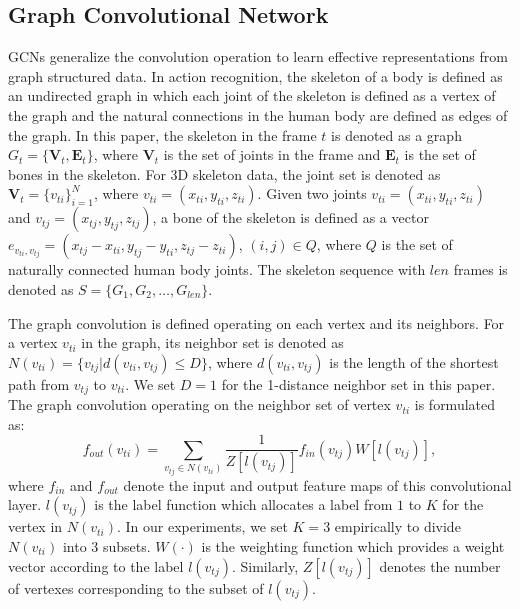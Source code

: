 \documentclass[runningheads]{llncs}
\begin{document}
\subsection{Graph Convolutional Network}
\label{section_gcn}
GCNs generalize the convolution operation to learn effective representations from graph structured data. In action recognition, the skeleton of a body is defined as an undirected graph in which each joint of the skeleton is defined as a vertex of the graph and the natural connections in the human body are defined as edges of the graph. In this paper, the skeleton in the frame $t$ is denoted as a graph $G_t=\{\textbf{V}_t,\textbf{E}_t\}$, where $\textbf{V}_t$ is the set of joints in the frame and $\textbf{E}_t$ is the set of bones in the skeleton. For 3D skeleton data, the joint set is denoted as $\textbf{V}_t = \{v_{ti}\}^N_{i=1}$, where $v_{ti}=(x_{ti},y_{ti},z_{ti})$. Given two joints $v_{ti}=(x_{ti},y_{ti},z_{ti})$ and $v_{tj}=(x_{tj},y_{tj},z_{tj})$, a bone of the skeleton is defined as a vector $e_{v_{ti},v_{tj}}=(x_{tj}-x_{ti},y_{tj}-y_{ti},z_{tj}-z_{ti})$, $(i,j)\in Q$, where $Q$ is the set of naturally connected human body joints. The skeleton sequence with $len$ frames is denoted as $S= \{G_1, G_2,\dots, G_{len} \}$.

The graph convolution is defined operating on each vertex and its neighbors. For a vertex $v_{ti}$ in the graph, its neighbor set is denoted as $N(v_{ti}) =\{v_{tj}|d(v_{ti},v_{tj})\leq D\}$, where $d(v_{ti},v_{tj})$ is the length of the shortest path from $v_{tj}$ to $v_{ti}$. We set $D=1$ for the 1-distance neighbor set in this paper.
The graph convolution operating on the neighbor set of vertex $v_{ti}$ is formulated as:
\begin{equation}
\label{eqn_gconv}
f_{out}(v_{ti})=\sum_{v_{tj}\in N(v_{ti})} \frac{1}{Z[l(v_{tj})]} f_{in}(v_{tj}) W[l(v_{tj})],
\end{equation}
where $f_{in}$ and $f_{out}$ denote the input and output feature maps of this convolutional layer. $l(v_{tj})$ is the label function which allocates a label from $1$ to $K$ for the vertex in $N(v_{ti})$. In our experiments, we set $K = 3$ empirically to divide $N(v_{ti})$ into $3$ subsets. $W(\cdot)$ is the weighting function which provides a weight vector according to the label $l(v_{tj})$. Similarly, $Z[l(v_{tj})]$ denotes the number of vertexes corresponding to the subset of $l(v_{tj})$.
\end{document}
